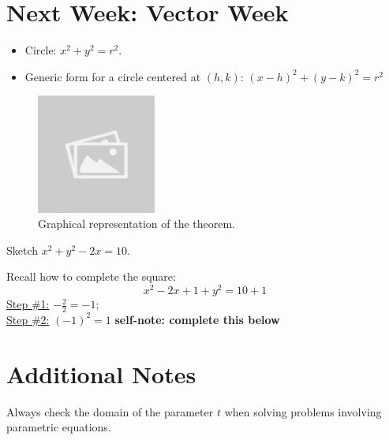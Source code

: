 \documentclass{article}
\begin{document}
\section*{Next Week: Vector Week}
\begin{theorembox}
\begin{itemize}
    \item Circle: \( x^2 + y^2 = r ^2 \).
    \item Generic form for a circle centered at \( (h, k) \): \( (x - h)^2 + (y - k)^2 = r^2 \)
\end{itemize}

\begin{figure}[H]
    \centering
    \includegraphics[width=0.35\textwidth]{sample_image1.jpg}
    \caption{Graphical representation of the theorem.}
    \label{fig:sample_image1}
\end{figure}

\end{theorembox}

\begin{examplebox}
Sketch \( x^2 + y^2 - 2x = 10 \).

\begin{solutionbox}
Recall how to complete the square:
\[
    x^2 - 2x + 1 + y^2 = 10 + 1
\]
\underline{Step \#1:} \( -\frac{2}{2} = -1 \); \\
\underline{Step \#2:} \( (-1)^2 = 1 \) 
\textbf{self-note: complete this below} 
\end{solutionbox}
\end{examplebox}

\section*{Additional Notes}
\begin{notebox}
Always check the domain of the parameter $t$ when solving problems involving parametric equations.
\end{notebox}
\end{document}
